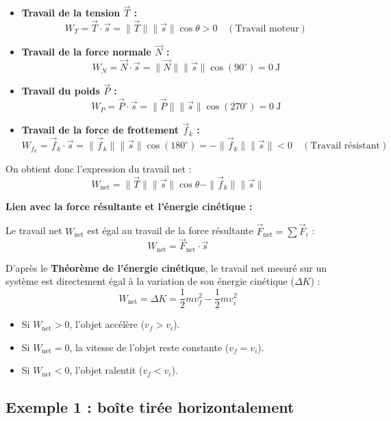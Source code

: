 \documentclass[11pt,openany]{book}
\begin{document}
\begin{itemize}
    \item \textbf{Travail de la tension $\vec{T}$ :} 
    \[ W_T = \vec{T} \cdot \vec{s} = \|\vec{T}\| \|\vec{s}\| \cos\theta > 0 \quad (\text{Travail moteur}) \]
    
    \item \textbf{Travail de la force normale $\vec{N}$ :} 
    \[ W_N = \vec{N} \cdot \vec{s} = \|\vec{N}\| \|\vec{s}\| \cos(90^\circ) = 0\ \mathrm{J} \]
    
    \item \textbf{Travail du poids $\vec{P}$ :} 
    \[ W_P = \vec{P} \cdot \vec{s} = \|\vec{P}\| \|\vec{s}\| \cos(270^\circ) = 0\ \mathrm{J} \]
    
    \item \textbf{Travail de la force de frottement $\vec{f}_k$ :} 
    \[ W_{f_k} = \vec{f}_k \cdot \vec{s} = \|\vec{f}_k\| \|\vec{s}\| \cos(180^\circ) = -\|\vec{f}_k\| \|\vec{s}\| < 0 \quad (\text{Travail résistant}) \]
\end{itemize}

On obtient donc l'expression du travail net :
\[
\boxed{W_{\text{net}} = \|\vec{T}\| \|\vec{s}\| \cos\theta - \|\vec{f}_k\| \|\vec{s}\|}
\]

\begin{important}
\textbf{Lien avec la force résultante et l'énergie cinétique :}

Le travail net $W_{\text{net}}$ est égal au travail de la force résultante $\vec{F}_{\text{net}} = \sum \vec{F}_i$ :
\[
W_{\text{net}} = \vec{F}_{\text{net}} \cdot \vec{s}
\]

D'après le \textbf{Théorème de l'énergie cinétique}, le travail net mesuré sur un système est directement égal à la variation de son énergie cinétique ($\Delta K$) :
\[
\boxed{W_{\text{net}} = \Delta K = \frac{1}{2} m v_f^2 - \frac{1}{2} m v_i^2}
\]
\begin{itemize}
    \item Si $W_{\text{net}} > 0$, l'objet accélère ($v_f > v_i$).
    \item Si $W_{\text{net}} = 0$, la vitesse de l'objet reste constante ($v_f = v_i$).
    \item Si $W_{\text{net}} < 0$, l'objet ralentit ($v_f < v_i$).
\end{itemize}
\end{important}

\subsection{Exemple 1 : boîte tirée horizontalement}
\end{document}
